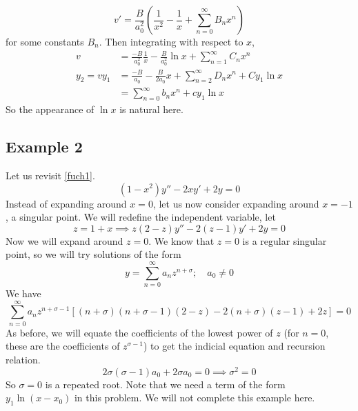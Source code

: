 \begin{itemize}
	      \[ v' = \frac{B}{a_0^2}\left( \frac{1}{x^2} - \frac{1}{x} + \sum_{n=0}^\infty B_n x^n \right) \]
	      for some constants \(B_n\). Then integrating with respect to \(x\),
	      \begin{align*}
		      v          & = \frac{-B}{a_0^2}\frac{1}{x} - \frac{B}{a_0^2}\ln x + \sum_{n=1}^\infty C_n x^n \\
		      y_2 = vy_1 & = \frac{-B}{a_0} - \frac{B}{2a_0}x + \sum_{n=2}^\infty D_n x^n + Cy_1\ln x       \\
		                 & = \sum_{n=0}^\infty b_nx^n + cy_1\ln x
	      \end{align*}
	      So the appearance of \(\ln x\) is natural here.
\end{itemize}

\subsection{Example 2}
Let us revisit \eqref{fuch1}.
\[ (1-x^2)y'' - 2xy' + 2y = 0 \]
Instead of expanding around \(x=0\), let us now consider expanding around \(x=-1\), a singular point. We will redefine the independent variable, let
\[ z = 1 + x \implies z(2-z)y'' - 2(z-1)y' + 2y = 0 \]
Now we will expand around \(z=0\). We know that \(z=0\) is a regular singular point, so we will try solutions of the form
\[ y = \sum_{n=0}^\infty a_nz^{n+\sigma};\quad a_0 \neq 0 \]
We have
\[ \sum_{n=0}^\infty a_nz^{n+\sigma-1}\left[ (n+\sigma)(n+\sigma-1)(2-z) - 2(n+\sigma)(z-1) + 2z \right] = 0 \]
As before, we will equate the coefficients of the lowest power of \(z\) (for \(n=0\), these are the coefficients of \(z^{\sigma - 1}\)) to get the indicial equation and recursion relation.
\[ 2\sigma(\sigma - 1)a_0 + 2\sigma a_0 = 0 \implies \sigma^2 = 0 \]
So \(\sigma = 0\) is a repeated root. Note that we need a term of the form \(y_1\ln (x-x_0)\) in this problem. We will not complete this example here.
